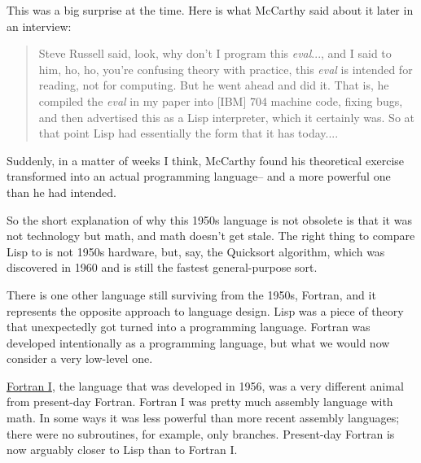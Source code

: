 This was a big surprise at the time.
                  Here is what McCarthy said about it later in an interview:
                  \begin{quote}

                    Steve Russell said, look, why don't I program this
                    \emph{eval}..., and I said to him, ho, ho, you're confusing
                    theory with practice, this \emph{eval} is intended for
                    reading, not for computing. But he went ahead and did it.
                    That is, he compiled the \emph{eval}
                    in my paper into [IBM] 704 machine code, fixing bugs, and
                    then advertised this as a Lisp interpreter, which it
                    certainly was. So at that point Lisp had essentially the
                    form that it has today....
                  
\end{quote}

                  Suddenly, in a matter of weeks I think, McCarthy found his
                  theoretical exercise transformed into an actual programming
                  language-- and a more powerful one than he had intended.

So
                  the short explanation of why this 1950s language is not
                  obsolete is that it was not technology but math, and math
                  doesn't get stale. The right thing to compare Lisp to is not
                  1950s hardware, but, say, the Quicksort algorithm, which was
                  discovered in 1960 and is still the fastest general-purpose
                  sort.

There is one other language still surviving
                  from the 1950s, Fortran, and it represents the opposite
                  approach to language design. Lisp was a piece of theory that
                  unexpectedly got turned into a programming language. Fortran
                  was developed intentionally as a programming language, but
                  what we would now consider a very low-level one.

\href{http://www.paulgraham.com/history.html}{Fortran I}, the language that was developed in 1956, was a very
                  different animal from present-day Fortran. Fortran I was
                  pretty much assembly language with math. In some ways it was
                  less powerful than more recent assembly languages; there were
                  no subroutines, for example, only branches. Present-day
                  Fortran is now arguably closer to Lisp than to Fortran I.

